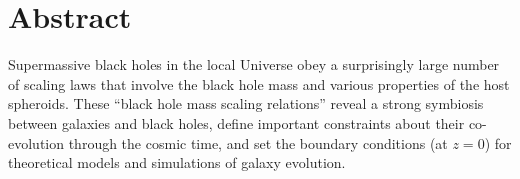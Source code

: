 \chapter*{Abstract}

Supermassive black holes in the local Universe obey a surprisingly large number of scaling laws 
that involve the black hole mass and various properties of the host spheroids. 
These ``black hole mass scaling relations'' reveal a strong symbiosis between galaxies and black holes, 
define important constraints about their co-evolution through the cosmic time, 
and set the boundary conditions (at $z=0$) for theoretical models and simulations of galaxy evolution. \\


